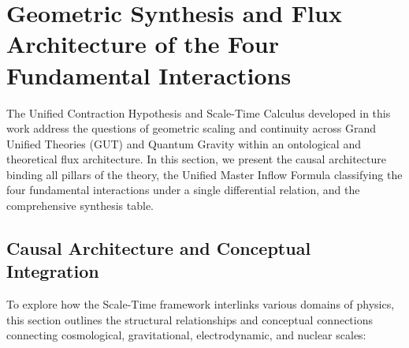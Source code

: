 \section{Geometric Synthesis and Flux Architecture of the Four Fundamental Interactions}
\label{sec:mantik_zincirleri}

The Unified Contraction Hypothesis and Scale-Time Calculus developed in this work address the questions of geometric scaling and continuity across Grand Unified Theories (GUT) and Quantum Gravity within an ontological and theoretical flux architecture. In this section, we present the causal architecture binding all pillars of the theory, the Unified Master Inflow Formula classifying the four fundamental interactions under a single differential relation, and the comprehensive synthesis table.

\subsection{Causal Architecture and Conceptual Integration}
\label{sec:zincirler_alt}

To explore how the Scale-Time framework interlinks various domains of physics, this section outlines the structural relationships and conceptual connections connecting cosmological, gravitational, electrodynamic, and nuclear scales:

